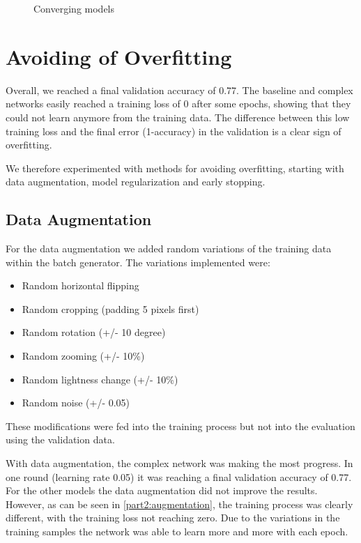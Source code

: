 \documentclass[sigconf,nonacm]{acmart}
\begin{document}
\begin{figure}[ht]
\begin{subfigure}[c]{0.45\columnwidth}
\end{subfigure}
\caption{Converging models}
\label{part2:converging}
\end{figure}

\section{Avoiding of Overfitting}


Overall, we reached a final validation accuracy of 0.77.
The baseline and complex networks easily reached a
training loss of 0 after some epochs, showing that
they could not learn anymore from the training data.
The difference between this low training loss and
the final error (1-accuracy) in the validation
is a clear sign of overfitting.

We therefore experimented with methods for avoiding
overfitting, starting with data augmentation,
model regularization and early stopping.

\subsection{Data Augmentation}

For the data augmentation we added random variations of
the training data within the batch generator.
The variations implemented were:
\begin{itemize}
\item Random horizontal flipping
\item Random cropping (padding 5 pixels first)
\item Random rotation (+/- 10 degree)
\item Random zooming (+/- 10\%)
\item Random lightness change (+/- 10\%)
\item Random noise (+/- 0.05)
\end{itemize}

These modifications were fed into the training process
but not into the evaluation using the validation data.

With data augmentation, the complex network was making the
most progress. In one round (learning rate 0.05) it was
reaching a final validation accuracy of 0.77.
For the other models the data augmentation did
not improve the results.
However, as can be seen in \ref{part2:augmentation},
the training process was clearly different,
with the training loss not reaching zero.
Due to the variations in the training samples
the network was able to learn
more and more with each epoch.
\end{document}
